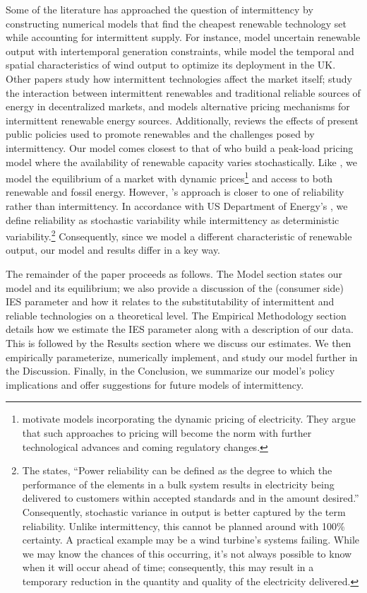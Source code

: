 \documentclass[11pt,a4paper,leqno]{extarticle}
\begin{document}
	Some of the literature has approached the question of intermittency by constructing numerical models that find the cheapest renewable technology set while accounting for intermittent supply. For instance, \citet{MN2006} model uncertain renewable output with intertemporal generation constraints, while \citet{NCK2007} model the temporal and spatial characteristics of wind output to optimize its deployment in the UK. Other papers study how intermittent technologies affect the market itself; \citet{AC2012} study the interaction between intermittent renewables and traditional reliable sources of energy in decentralized markets, and \citet{Chao2011} models alternative pricing mechanisms for intermittent renewable energy sources. Additionally, \citet{Boren2012} reviews the effects of present public policies used to promote renewables and the challenges posed by intermittency. Our model comes closest to that of \citet{HH} who build a peak-load pricing model where the availability of renewable capacity varies stochastically. Like \citeauthor{HH}, we model the  equilibrium of a market with dynamic prices\footnote{ \citeauthor{HH} motivate models incorporating the dynamic pricing of electricity. They argue that such approaches to pricing will become the norm with further technological advances and coming regulatory changes.} and access to both renewable and fossil energy. However,  \citeauthor{HH}'s approach  is closer to one of reliability rather than intermittency. In accordance with US Department of Energy's \citet{ORNL}, we define reliability as stochastic variability while intermittency as deterministic variability.\footnote{ 
		The \citeauthor{ORNL} states, ``Power reliability can be defined as the degree to which the performance of the elements in a bulk system results in electricity being delivered to customers within accepted standards and in the amount desired.'' Consequently, stochastic variance in output is better captured by the term  reliability.  Unlike intermittency, this cannot be planned around with 100\% certainty. A practical example may be a wind turbine's systems failing. While we may know the chances of this occurring, it's not always possible to know when it will occur ahead of time; consequently, this may result in a temporary reduction in the quantity and quality of the electricity delivered. 
	} Consequently, since we model a different characteristic of renewable output, our model and results differ in a key way. 
	
	The remainder of the paper proceeds as follows. The Model section states our model and its equilibrium; we also provide a discussion of the (consumer side) IES parameter and how it relates to the substitutability of intermittent and reliable technologies on a theoretical level. The Empirical Methodology section details how we estimate the IES parameter along with a description of our data. This is followed by the Results section where we discuss our estimates. We then empirically parameterize, numerically implement, and study our model further in the Discussion. Finally, in the Conclusion, we summarize our model's policy implications and offer suggestions for future models of intermittency. 
	
\end{document}
